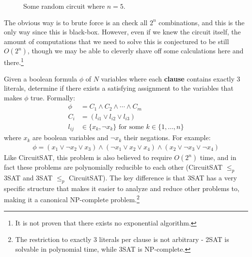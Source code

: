 \begin{definition}[CircuitSAT]
\begin{figure}[H]
      \caption{Some random circuit where $n = 5$.} 
      \label{fig:random_circuit}
    \end{figure}

    The obvious way is to brute force is an check all $2^n$ combinations, and this is the only way since this is black-box. However, even if we knew the circuit itself, the amount of computations that we need to solve this is conjectured to be still $O(2^n)$, though we may be able to cleverly shave off some calculations here and there.\footnote{It is not proven that there exists no exponential algorithm.}
  \end{definition}

  \begin{definition}[3SAT]
    \label{def:3sat}
    Given a boolean formula $\phi$ of $N$ variables where each \textbf{clause} contains exactly 3 literals, determine if there exists a satisfying assignment to the variables that makes $\phi$ true. Formally:
    \begin{align*}
      \phi &= C_1 \land C_2 \land \cdots \land C_m \\
      C_i &= (l_{i1} \lor l_{i2} \lor l_{i3}) \\
      l_{ij} &\in \{x_k, \neg x_k\} \text{ for some } k \in \{1,\ldots,n\}
    \end{align*}
    where $x_k$ are boolean variables and $\neg x_k$ their negations. For example:
    \begin{align*}
      \phi = (x_1 \lor \neg x_2 \lor x_3) \land (\neg x_1 \lor x_2 \lor x_4) \land (x_2 \lor \neg x_3 \lor \neg x_4)
    \end{align*}
    Like CircuitSAT, this problem is also believed to require $O(2^n)$ time, and in fact these problems are polynomially reducible to each other (CircuitSAT $\leq_p$ 3SAT and 3SAT $\leq_p$ CircuitSAT). The key difference is that 3SAT has a very specific structure that makes it easier to analyze and reduce other problems to, making it a canonical NP-complete problem.\footnote{The restriction to exactly 3 literals per clause is not arbitrary - 2SAT is solvable in polynomial time, while 3SAT is NP-complete.}
  \end{definition}

